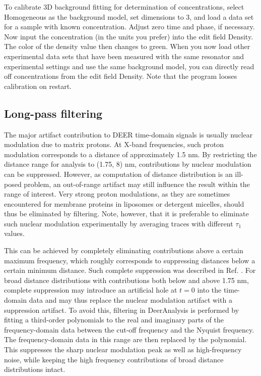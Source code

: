 \documentclass{article}
\begin{document}
To calibrate 3D background fitting for determination of concentrations, select
{\ttfamily Homogeneous} as the background model, set {\ttfamily dimensions} to 3, and load a data set for a sample with known concentration. Adjust zero time and phase, if necessary. Now input
the concentration (in the units you prefer) into the edit field {\ttfamily Density}. The color of the density value then changes to green. When you now load other experimental data sets that have
been measured with the same resonator and experimental settings and use the same background model, you can directly read off concentrations
from the edit field {\ttfamily Density}. Note that the program looses calibration on
restart.

\subsection{Long-pass filtering}
The major artifact contribution to DEER time-domain signals is usually nuclear
modulation due to matrix protons. At X-band frequencies, such proton modulation
corresponds to a distance of approximately 1.5 nm. By restricting the distance range for analysis to (1.75, 8) nm, contributions by nuclear modulation can be suppressed. However, as computation of distance distribution is an ill-posed problem, an out-of-range artifact may
still influence the result within the range of interest. Very strong proton modulations,
as they are sometimes encountered for membrane proteins in liposomes
or detergent micelles, should thus be eliminated by filtering. Note, however, that it is preferable to eliminate such nuclear modulation experimentally by averaging traces with different $\tau_1$ values.

This can be achieved by completely eliminating contributions above a certain
maximum frequency, which roughly corresponds to suppressing distances
below a certain minimum distance. Such complete suppression was described in
Ref. \cite{jeschke2004b}. For broad distance distributions with contributions both below and above 1.75 nm, complete suppression may introduce an artificial hole at $t = 0$ into the time-domain data and may thus replace the nuclear modulation artifact with a suppression
artifact. To avoid this, filtering in DeerAnalysis is performed by fitting a third-order polynomials to the real and imaginary parts of the frequency-domain data between
the cut-off frequency and the Nyquist frequency. The frequency-domain data
in this range are then replaced by the polynomial. This suppresses the sharp
nuclear modulation peak as well as high-frequency noise, while keeping the high frequency
contributions of broad distance distributions intact.
\end{document}
